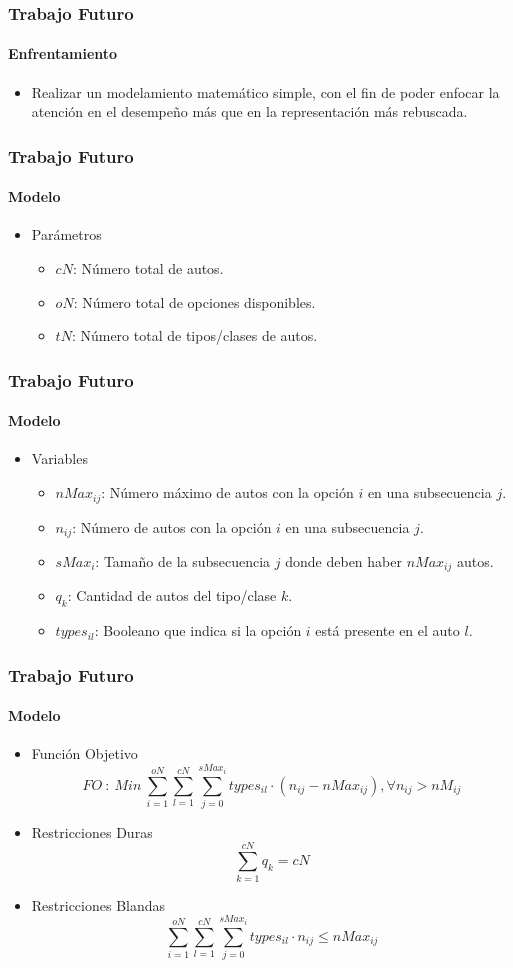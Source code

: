 

\frame
{
\frametitle{Trabajo Futuro}
\framesubtitle{Enfrentamiento}
\begin{itemize}
	\item Realizar un modelamiento matemático simple,
		con el fin de poder enfocar la atención en el desempeño
		más que en la representación más rebuscada.
\end{itemize}
}

\frame
{
\frametitle{Trabajo Futuro}
\framesubtitle{Modelo}
\begin{itemize}
    \item Parámetros
    \begin{itemize}
        \item $cN$: Número total de autos.
        \item $oN$: Número total de opciones disponibles.
        \item $tN$: Número total de tipos/clases de autos.
    \end{itemize}
\end{itemize}
}

\frame
{
\frametitle{Trabajo Futuro}
\framesubtitle{Modelo}
\begin{itemize}
   \item Variables
    \begin{itemize}
        \item $nMax_{ij}$: Número máximo de autos con la opción $i$ en una subsecuencia $j$.
        \item $n_{ij}$: Número de autos con la opción $i$ en una subsecuencia $j$.
        \item $sMax_{i}$: Tamaño de la subsecuencia $j$ donde deben haber $nMax_{ij}$ autos.
        \item $q_{k}$: Cantidad de autos del tipo/clase $k$.
        \item $types_{il}$: Booleano que indica si la opción $i$ está presente en el auto $l$.
    \end{itemize}
\end{itemize}
}

\frame
{
\frametitle{Trabajo Futuro}
\framesubtitle{Modelo}
\begin{itemize}
    \item Función Objetivo
    $$FO\ :\ Min\ \sum\limits_{i=1}^{oN} \sum\limits_{l=1}^{cN} \sum\limits_{j=0}^{sMax_{i}} types_{il}\cdot (n_{ij} - nMax_{ij}), \forall n_{ij} > nM_{ij}$$
    \item Restricciones Duras
    $$\sum\limits_{k=1}^{cN} q_{k} = cN$$
    \item Restricciones Blandas
    $$\sum\limits_{i=1}^{oN} \sum\limits_{l=1}^{cN} \sum\limits_{j=0}^{sMax_{i}} types_{il}\cdot n_{ij} \leq nMax_{ij}$$
\end{itemize}
}

